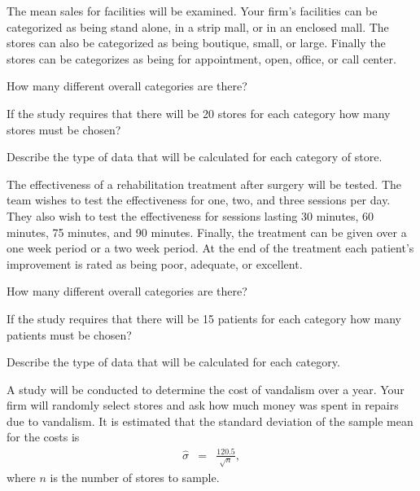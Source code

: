 \begin{problem}
\item The mean sales for facilities will be examined. Your firm's
  facilities can be categorized as being stand alone, in a strip mall,
  or in an enclosed mall. The stores can also be categorized as being
  boutique, small, or large. Finally the stores can be categorizes as
  being for appointment, open, office, or call center.
    \begin{subproblem}
      \item How many different overall categories are there?
        \vfill
      \item If the study requires that there will be 20 stores for
        each category how many stores must be chosen?
        \vfill
      \item Describe the type of data that will be calculated for each
        category of store.
        \vspace{2em}
    \end{subproblem}

\clearpage

\item The effectiveness of a rehabilitation treatment after surgery
  will be tested. The team wishes to test the effectiveness for one,
  two, and three sessions per day. They also wish to test the
  effectiveness for sessions lasting 30 minutes, 60 minutes, 75
  minutes, and 90 minutes. Finally, the treatment can be given over a
  one week period or a two week period. At the end of the treatment
  each patient's improvement is rated as being poor, adequate, or excellent.
    \begin{subproblem}
      \item How many different overall categories are there?
        \vfill
      \item If the study requires that there will be 15 patients for
        each category how many patients must be chosen?
        \vfill
      \item Describe the type of data that will be calculated for each
        category.
        \vspace{2em}
    \end{subproblem}

\clearpage

\item A study will be conducted to determine the cost of vandalism
  over a year. Your firm will randomly select stores and ask how much
  money was spent in repairs due to vandalism. It is estimated that
  the standard deviation of the sample mean for the costs is
  \begin{eqnarray*}
    \hat{\sigma} & = & \frac{120.5}{\sqrt{n}},
  \end{eqnarray*}
  where $n$ is the number of stores to sample.


\end{problem}
